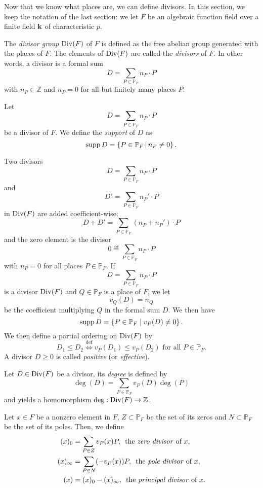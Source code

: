 Now that we know what places are, we can define divisors. In this section, we
keep the notation of the last section: we let $F$ be an algebraic function field
over a finite field $\mathbf{k}$ of characteristic $p$.
\begin{defi}[Divisor]
  The \emph{divisor group} $\operatorname{Div}(F)$ of $F$ is defined as the free abelian group generated
  with the places of $F$. The elements of $\operatorname{Div}(F)$ are called the
  \emph{divisors} of $F$. In other words, a divisor is a formal sum
  \[
    D = \sum_{P\in\mathbb{P}_F} n_P\cdot P
  \]
  with $n_P\in\mathbb{Z}$ and $n_P=0$ for all but finitely many places $P$.
\end{defi}
\begin{defi}[Support]
  Let 
  \[
    D = \sum_{P\in\mathbb{P}_F} n_P\cdot P
  \]
  be a divisor of $F$. We define the \emph{support} of $D$ as
  \[
    \operatorname{supp} D = \left\{ P\in\mathbb{P}_F\,|\,n_P\neq 0 \right\}.
  \]
\end{defi}
Two divisors 
\[
  D = \sum_{P\in\mathbb{P}_F} n_P\cdot P
\]
and
\[
  D' = \sum_{P\in\mathbb{P}_F} n_P'\cdot P
\]
in $\operatorname{Div}(F)$ are added coefficient-wise:
\[
  D+D' = \sum_{P\in\mathbb{P}_F} (n_P+n_P')\cdot P
\]
and the zero element is the divisor
\[
  0 \eqdef \sum_{P\in\mathbb{P}_F} n_P\cdot P
\]
with $n_P=0$ for all places $P\in\mathbb{P}_F$. If
\[
  D = \sum_{P\in\mathbb{P}_F}n_P\cdot P
\]
is a divisor $\operatorname{Div}(F)$ and $Q\in\mathbb{P}_F$ is a place of $F$, we let 
\[
  v_Q(D) = n_Q
\]
be the coefficient multiplying $Q$ in the formal sum $D$. We then have
\[
  \operatorname{supp} D = \left\{ P\in\mathbb{P}_F\mid v_P(D)\neq 0 \right\}.
\]
We then define a partial ordering on $\operatorname{Div}(F)$ by
\[
  D_1 \leq D_2 \overset{\text{def}}{\Longleftrightarrow} v_P(D_1)\leq v_P(D_2)\text{ for all
  }P\in\mathbb{P}_F.
\]
A divisor $D\geq 0$ is called \emph{positive} (or \emph{effective}).
\begin{defi}[Degree]
  Let $D\in\operatorname{Div}(F)$ be a divisor, its \emph{degree} is defined by
  \[
    \deg(D) = \sum_{P\in\mathbb{P}_F}v_P(D)\deg(P)
  \]
  and yields a homomorphism $\deg:\operatorname{Div}(F)\to\mathbb{Z}$.
\end{defi}
\begin{defi}
  Let $x\in F$ be a nonzero element in $F$, $Z\subset\mathbb{P}_F$ be the set of
  its zeros and $N\subset\mathbb{P}_F$ be the set of its poles. Then, we define
  \begin{align*}
    (x)_0 &= \sum_{P\in Z}v_P(x)P ,\,\text{ the \emph{zero divisor} of }x,\\
    (x)_\infty &= \sum_{P\in N}(-v_P(x))P ,\,\text{ the \emph{pole divisor} of
  }x,\\
    (x) &= (x)_0 - (x)_\infty ,\,\text{ the \emph{principal divisor} of }x.
  \end{align*}
\end{defi}
